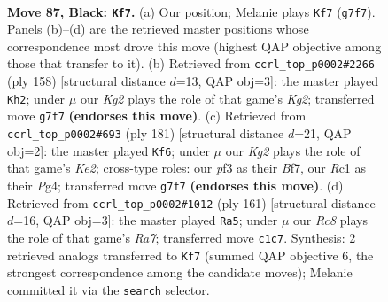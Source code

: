 \documentclass[11pt]{article}
\begin{document}
\clearpage

\begin{figure}[p]\centering
\begin{subfigure}{0.46\textwidth}\centering
\resizebox{\linewidth}{!}{%
\newchessgame
\chessboard[
  setfen={8/6k1/4pp2/7R/P3P3/5P1K/1R6/2r5 b - - 1 87},
  showmover=false,
  pgfstyle=straightmove, color=movearrow, markmove={g7-f7}
]}
\caption{}
\end{subfigure}\hfill
\begin{subfigure}{0.46\textwidth}\centering
\resizebox{\linewidth}{!}{%
\newchessgame
\chessboard[
  setfen={5r1k/2R5/6p1/7p/7P/6P1/6K1/8 w - - 46 80},
  showmover=false,
  pgfstyle=straightmove, color=movearrow, markmove={g2-h2}
]}
\caption{}
\end{subfigure}
\\[4pt]
\begin{subfigure}{0.46\textwidth}\centering
\resizebox{\linewidth}{!}{%
\newchessgame
\chessboard[
  setfen={8/4kb2/8/5pp1/R2K2p1/6P1/7P/8 b - - 1 91},
  showmover=false,
  pgfstyle=straightmove, color=movearrow, markmove={e7-f6}
]}
\caption{}
\end{subfigure}\hfill
\begin{subfigure}{0.46\textwidth}\centering
\resizebox{\linewidth}{!}{%
\newchessgame
\chessboard[
  setfen={6k1/8/6p1/6Pp/1R1K3P/5P2/r7/8 b - - 51 81},
  showmover=false,
  pgfstyle=straightmove, color=movearrow, markmove={a2-a5}
]}
\caption{}
\end{subfigure}
\caption{\textbf{Move 87, Black: \texttt{Kf7}.} (a) Our position; Melanie plays \texttt{Kf7} (\texttt{g7f7}). Panels (b)--(d) are the retrieved master positions whose correspondence most drove this move (highest QAP objective among those that transfer to it). (b) Retrieved from \texttt{ccrl\_top\_p0002\#2266} (ply 158) [structural distance $d$=13, QAP obj=3]: the master played \texttt{Kh2}; under $\mu$ our \emph{Kg2} plays the role of that game's \emph{Kg2}; transferred move \texttt{g7f7} \textbf{(endorses this move)}. (c) Retrieved from \texttt{ccrl\_top\_p0002\#693} (ply 181) [structural distance $d$=21, QAP obj=2]: the master played \texttt{Kf6}; under $\mu$ our \emph{Kg2} plays the role of that game's \emph{Ke2}; cross-type roles: our \emph{p}f3 as their \emph{B}f7, our \emph{R}c1 as their \emph{P}g4; transferred move \texttt{g7f7} \textbf{(endorses this move)}. (d) Retrieved from \texttt{ccrl\_top\_p0002\#1012} (ply 161) [structural distance $d$=16, QAP obj=3]: the master played \texttt{Ra5}; under $\mu$ our \emph{Rc8} plays the role of that game's \emph{Ra7}; transferred move \texttt{c1c7}. Synthesis: 2 retrieved analogs transferred to \texttt{Kf7} (summed QAP objective 6, the strongest correspondence among the candidate moves); Melanie committed it via the \texttt{search} selector.}
\label{fig:thought-m173}
\end{figure}
\end{document}
